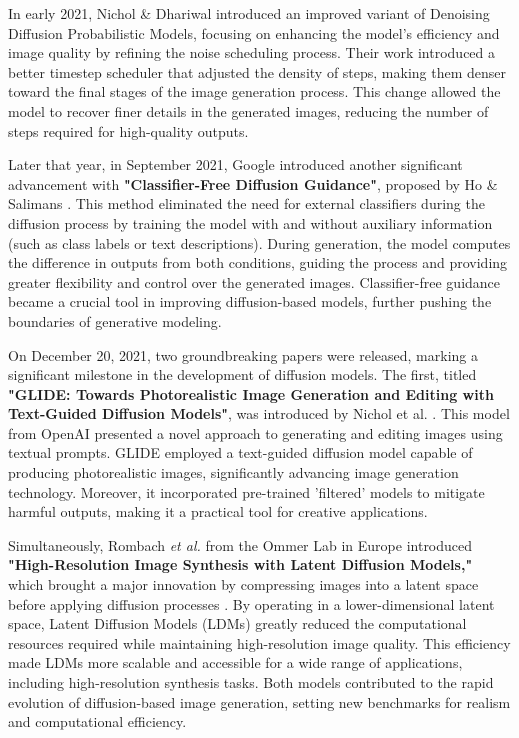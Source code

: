 \documentclass[12pt,DIV14,BCOR12mm,a4paper,footinclude=false,headinclude,parskip=half-,twoside,openright,cleardoublepage=empty,toc=index,bibliography=totoc,listof=totoc]{scrreprt}
\numberwithin{equation}{chapter}
\begin{document}
In early 2021, Nichol \& Dhariwal introduced an improved variant of Denoising Diffusion Probabilistic Models, focusing on enhancing the model's efficiency and image quality by refining the noise scheduling process\cite{Improved_denoising_diffusion}. Their work introduced a better timestep scheduler that adjusted the density of steps, making them denser toward the final stages of the image generation process. This change allowed the model to recover finer details in the generated images, reducing the number of steps required for high-quality outputs.

Later that year, in September 2021, Google introduced another significant advancement with \textbf{"Classifier-Free Diffusion Guidance"}, proposed by Ho \& Salimans \cite{ho2022classifier}. This method eliminated the need for external classifiers during the diffusion process by training the model with and without auxiliary information (such as class labels or text descriptions). During generation, the model computes the difference in outputs from both conditions, guiding the process and providing greater flexibility and control over the generated images. Classifier-free guidance became a crucial tool in improving diffusion-based models, further pushing the boundaries of generative modeling.

On December 20, 2021, two groundbreaking papers were released, marking a significant milestone in the development of diffusion models. The first, titled \textbf{"GLIDE: Towards Photorealistic Image Generation and Editing with Text-Guided Diffusion Models"}, was introduced by Nichol et al. \cite{nichol2021glide}. This model from OpenAI presented a novel approach to generating and editing images using textual prompts. GLIDE employed a text-guided diffusion model capable of producing photorealistic images, significantly advancing image generation technology. Moreover, it incorporated pre-trained 'filtered' models to mitigate harmful outputs, making it a practical tool for creative applications.

Simultaneously, Rombach \textit{et al.} from the Ommer Lab in Europe introduced \textbf{"High-Resolution Image Synthesis with Latent Diffusion Models,"} which brought a major innovation by compressing images into a latent space before applying diffusion processes \cite{Latent_Diffusion}. By operating in a lower-dimensional latent space, Latent Diffusion Models (LDMs) greatly reduced the computational resources required while maintaining high-resolution image quality. This efficiency made LDMs more scalable and accessible for a wide range of applications, including high-resolution synthesis tasks. Both models contributed to the rapid evolution of diffusion-based image generation, setting new benchmarks for realism and computational efficiency.
\end{document}

